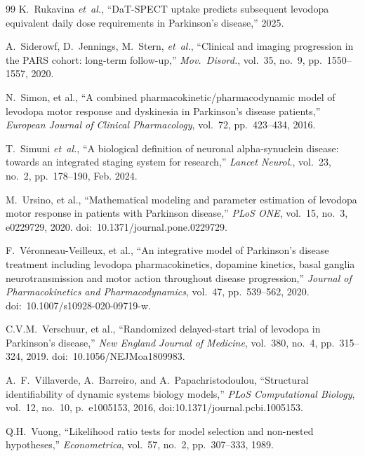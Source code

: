 \begin{thebibliography}{99}
K.~Rukavina \textit{et~al.}, ``DaT-SPECT uptake predicts subsequent
levodopa equivalent daily dose requirements in Parkinson's disease,''
2025.

A.~Siderowf, D.~Jennings, M.~Stern, \textit{et~al.}, ``Clinical and imaging progression in the PARS cohort: long-term follow-up,'' \textit{Mov.\ Disord.}, vol.~35, no.~9, pp.~1550--1557, 2020.

N.~Simon, et al., ``A combined pharmacokinetic/pharmacodynamic model of levodopa motor response and dyskinesia in Parkinson's disease patients,'' \textit{European Journal of Clinical Pharmacology}, vol.~72, pp.~423--434, 2016.

T.~Simuni \textit{et~al.}, ``A biological definition of neuronal alpha-synuclein disease: towards an integrated staging system for research,'' \textit{Lancet Neurol.}, vol.~23, no.~2, pp.~178--190, Feb. 2024.

M.~Ursino, et al., ``Mathematical modeling and parameter estimation of levodopa motor response in patients with Parkinson disease,'' \textit{PLoS ONE}, vol.~15, no.~3, e0229729, 2020. doi:~10.1371/journal.pone.0229729.

F.~V\'{e}ronneau-Veilleux, et al., ``An integrative model of Parkinson's disease treatment including levodopa pharmacokinetics, dopamine kinetics, basal ganglia neurotransmission and motor action throughout disease progression,'' \textit{Journal of Pharmacokinetics and Pharmacodynamics}, vol.~47, pp.~539--562, 2020. doi:~10.1007/s10928-020-09719-w.

C.V.M.~Verschuur, et al., ``Randomized delayed-start trial of levodopa in Parkinson's disease,'' \textit{New England Journal of Medicine}, vol.~380, no.~4, pp.~315--324, 2019. doi:~10.1056/NEJMoa1809983.


A.~F.~Villaverde, A.~Barreiro, and A.~Papachristodoulou, ``Structural identifiability of dynamic systems biology models,'' \textit{PLoS Computational Biology}, vol.~12, no.~10, p.~e1005153, 2016, doi:10.1371/journal.pcbi.1005153.

Q.H.~Vuong, ``Likelihood ratio tests for model selection and non-nested
hypotheses,'' \textit{Econometrica}, vol.~57, no.~2, pp.~307--333,
1989.

\end{thebibliography}
